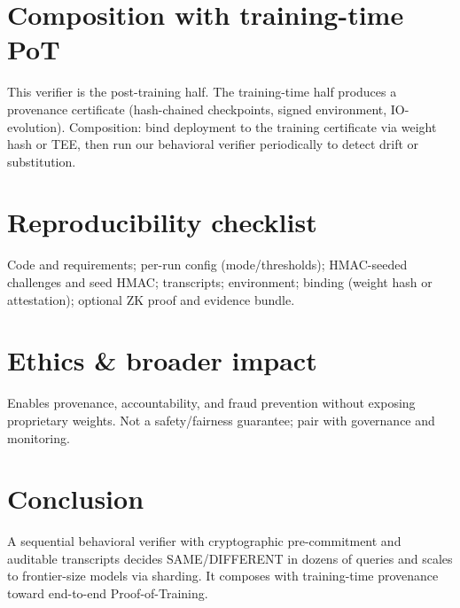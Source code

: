 \documentclass{article}
\begin{document}
\section{Composition with training-time PoT}
This verifier is the post-training half. The training-time half produces a provenance certificate (hash-chained checkpoints, signed environment, IO-evolution). Composition: bind deployment to the training certificate via weight hash or TEE, then run our behavioral verifier periodically to detect drift or substitution.

\section{Reproducibility checklist}
Code and requirements; per-run config (mode/thresholds); HMAC-seeded challenges and seed HMAC; transcripts; environment; binding (weight hash or attestation); optional ZK proof and evidence bundle.

\section{Ethics \& broader impact}
Enables provenance, accountability, and fraud prevention without exposing proprietary weights.
Not a safety/fairness guarantee; pair with governance and monitoring.

\section{Conclusion}
A sequential behavioral verifier with cryptographic pre-commitment and auditable transcripts decides SAME/DIFFERENT in dozens of queries and scales to frontier-size models via sharding. It composes with training-time provenance toward end-to-end Proof-of-Training.



\end{document}
